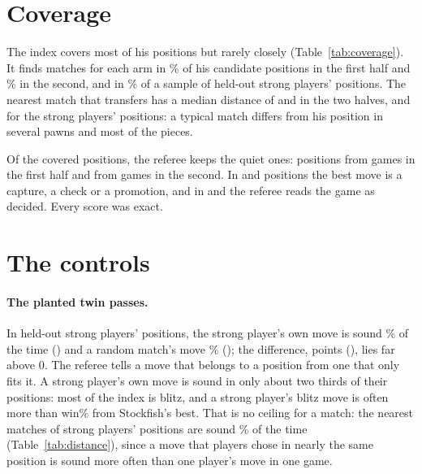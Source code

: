 \documentclass[11pt]{article}
\begin{document}
\section{Coverage}

\CoverageTable

The index covers most of his positions but rarely closely (Table~\ref{tab:coverage}). It finds
\Arm{} matches for each arm in \CoveredFirst\% of his candidate positions in the first half and
\CoveredSecond\% in the second, and in \StrongCovered\% of a sample of \StrongSample{} held-out
strong players' positions. The nearest match that transfers has a median distance of
\NearMedianFirst{} and \NearMedianSecond{} in the two halves, and \StrongNearMedian{} for the
strong players' positions: a typical match differs from his position in several pawns and most
of the pieces.

Of the covered positions, the referee keeps the quiet ones: \ScoredFirst{} positions from
\ScoredGamesFirst{} games in the first half and \ScoredSecond{} from \ScoredGamesSecond{} games in
the second. In \ForcingFirst{} and \ForcingSecond{} positions the best move is a capture, a check
or a promotion, and in \DecidedFirst{} and \DecidedSecond{} the referee reads the game as decided.
Every score was exact.

\section{The controls}

\paragraph{The planted twin passes.} In \StrongPositions{} held-out strong players' positions, the
strong player's own move is sound \TwinSound\% of the time (\TwinSoundCi) and a random match's
move \TwinR\% (\TwinRCi); the difference, \TwinLift{} points (\TwinLiftCi), lies far above 0. The
referee tells a move that belongs to a position from one that only fits it. A strong player's own
move is sound in only about two thirds of their positions: most of the index is blitz, and a
strong player's blitz move is often more than \Window{} win\% from Stockfish's best. That is no
ceiling for a match: the nearest matches of strong players' positions are sound \StrongDistZero\%
of the time (Table~\ref{tab:distance}), since a move that players chose in nearly the same
position is sound more often than one player's move in one game.
\end{document}
